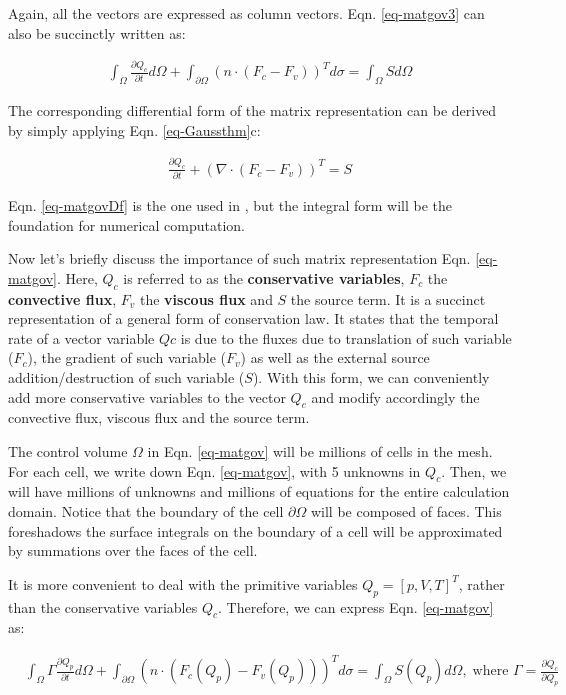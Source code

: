 \documentclass[12pt, letterpaper]{report}
\begin{document}
Again, all the vectors are expressed as column vectors. Eqn. \ref{eq-matgov3} can also be succinctly
written as:

\begin{align}\label{eq-matgov}
   \int_{\Omega}\frac{\partial Q_c}{\partial t}d\Omega +  \int_{\partial \Omega} (n \cdot (F_c -
   F_v))^T d\sigma = \int_{\Omega} S d\Omega
\end{align}

The corresponding differential form of the matrix representation can be derived by simply applying
Eqn. \ref{eq-Gaussthm}c:

\begin{align}\label{eq-matgovDf}
   \frac{\partial Q_c}{\partial t} + (\nabla \cdot (F_c - F_v))^T = S
\end{align}

Eqn. \ref{eq-matgovDf} is the one used in \cite{li2006unified}, but the integral form will be the
foundation for numerical computation. \paraspace 

Now let's briefly discuss the importance of such matrix representation Eqn. \ref{eq-matgov}. Here,
$Q_c$ is referred to as the {\bf conservative variables}, $F_c$ the {\bf convective flux}, $F_v$ the
{\bf viscous flux} and $S$ the source term. It is a succinct representation of a general form of
conservation law. It states that the temporal rate of a vector variable $Qc$  is due to the fluxes
due to translation of such variable ($F_c$), the gradient of such variable ($F_v$) as well as the
external source addition/destruction of such variable ($S$). With this form, we can conveniently add
more conservative variables to the vector $Q_c$ and modify accordingly the convective flux, viscous
flux and the source term. \paraspace

The control volume $\Omega$ in Eqn. \ref{eq-matgov} will be millions of cells in the mesh. For each
cell, we write down Eqn. \ref{eq-matgov}, with 5 unknowns in $Q_c$. Then, we will have millions of
unknowns and millions of equations for the entire calculation domain. Notice that the boundary of
the cell $\partial \Omega$ will be composed of faces. This foreshadows the surface integrals on the
boundary of a cell will be approximated by summations over the faces of the cell. \paraspace

It is more convenient to deal with the primitive variables $Q_p = [p, V, T]^T$, rather than the
conservative variables $Q_c$. Therefore, we can express Eqn. \ref{eq-matgov} as:

\begin{align}\label{eq-govready}
   &\int_{\Omega}\Gamma \frac{\partial Q_p}{\partial t}d\Omega + \int_{\partial \Omega} (n \cdot
   (F_c(Q_p) - F_v(Q_p)))^T d\sigma = \int_{\Omega} S(Q_p) d\Omega, \; \textrm{where }\Gamma = \frac{\partial Q_c}{\partial Q_p}
\end{align}
\end{document}
